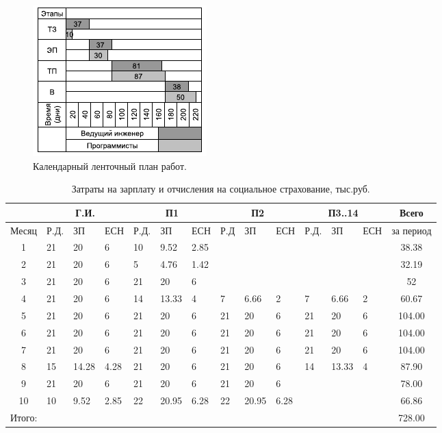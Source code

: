 \begin{figure}[ht]
	\centering
	\includegraphics{econ_1.png}
	\caption{Календарный ленточный план работ.}
	\label{pic:econ_1}
\end{figure}

\begin{table}
    \centering
	\begin{tabularx}{\textwidth}{|c||X|X|X||X|X|X||X|X|X||X|X|X||c|}
		\hline
		& \multicolumn{3}{c||}{Г.И.} & \multicolumn{3}{c||}{П1} &
		\multicolumn{3}{c||}{П2} & \multicolumn{3}{c||}{П3..14} & Всего\\
		\hline
		Месяц & Р.Д. & ЗП & ЕСН & Р.Д. & ЗП & ЕСН & Р.Д & ЗП & ЕСН &
		Р.Д. & ЗП & ЕСН & за период\\
		\hline
		1 & 21 & 20 & 6 & 10 & 9.52 & 2.85 & & & & & & & 38.38\\
		\hline
		2 & 21 & 20 & 6 & 5 & 4.76 & 1.42 & & & & & & & 32.19\\
		\hline
		3 & 21 & 20 & 6 & 21 & 20 & 6 & & & & & & & 52\\
		\hline
		4 & 21 & 20 & 6 & 14 & 13.33 & 4 & 7 & 6.66 & 2 & 7 & 6.66 & 2 & 60.67\\
		\hline
		5 & 21 & 20 & 6 & 21 & 20 & 6 & 21 & 20 & 6 & 21 & 20 & 6 & 104.00\\
		\hline
		6 & 21 & 20 & 6 & 21 & 20 & 6 & 21 & 20 & 6 & 21 & 20 & 6 & 104.00\\
		\hline
		7 & 21 & 20 & 6 & 21 & 20 & 6 & 21 & 20 & 6 & 21 & 20 & 6 & 104.00\\
		\hline
		8 & 15 & 14.28 & 4.28 & 21 & 20 & 6 & 21 & 20 & 6 & 14 & 13.33 & 4 & 87.90\\
		\hline
		9 & 21 & 20 & 6 & 21 & 20 & 6 & 21 & 20 & 6 & & & & 78.00\\
		\hline
		10 & 10 & 9.52 & 2.85 & 22 & 20.95 & 6.28 & 22 & 20.95 & 6.28 & & & & 66.86\\
		\hline
		\multicolumn{13}{|l||}{Итого: } & 728.00 \\
		\hline
	\end{tabularx}
	\captionsetup{justification=centering}
	\caption{Затраты на зарплату и отчисления на социальное страхование, тыс.руб.}
	\label{table:econ_5}
\end{table}

